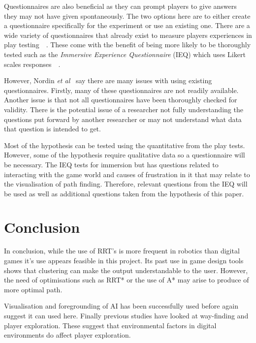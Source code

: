 \documentclass[journal]{IEEEtran}
\begin{document}
Questionnaires are also beneficial as they can prompt players to give answers they may not have given spontaneously. The two options here are to either create a questionnaire specifically for the experiment or use an existing one. There are a wide variety of questionnaires that already exist to measure players experiences in play testing~\cite{nordin2014}~\cite{Jennett2008}. These come with the benefit of being more likely to be thoroughly tested such as the \textit{Immersive  Experience
Questionnaire} (IEQ) which uses Likert scales responses~\cite{nordin2014}~\cite{Jennett2008}.
 
However, Nordin \textit{et al}~\cite{nordin2014} say there are many issues with using existing questionnaires. Firstly, many of these questionnaires are not readily available. Another issue is that not all questionnaires have been thoroughly checked for validity. There is the potential issue of a researcher not fully understanding the questions put forward by another researcher or may not understand what data that question is intended to get.

Most of the hypothesis can be tested using the quantitative from the play tests. However, some of the hypothesis require qualitative data so a questionnaire will be necessary.  The IEQ tests for immersion but has questions related to interacting with the game world and causes of frustration in it that may relate to the visualisation of path finding.  Therefore, relevant questions from the IEQ will be used as well as additional questions taken from the hypothesis of this paper.


\section{Conclusion}
In conclusion, while the use of RRT's is more frequent in robotics than digital games it's use appears feasible in this project. Its past use in game design tools shows that clustering can make the output understandable to the user. However,  the need of optimisations  such as RRT* or the use of A* may arise to produce of more optimal path. 

Visualisation and foregrounding of AI has been successfully used before again suggest it can used here. Finally previous studies have looked at way-finding and player exploration. These suggest that environmental factors in digital environments do affect player exploration.






\end{document}
